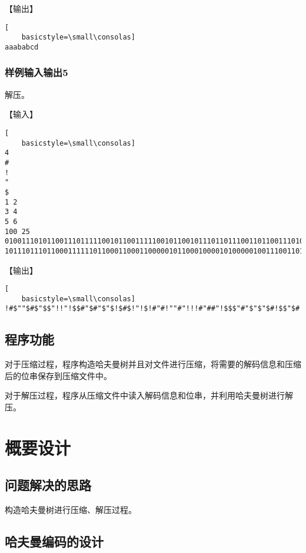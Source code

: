 \documentclass{article}
\begin{document}
【输出】

\begin{lstlisting}[
    basicstyle=\small\consolas]
aaababcd
\end{lstlisting}

\subsubsection{样例输入输出5}

解压。

【输入】

\begin{lstlisting}[
    basicstyle=\small\consolas]
4
#
!
"
$
1 2
3 4
5 6
100 25
010011101011001110111110010110011111001011001011101101110011011001110100100001101000100101010010000010011111111000
10111011101100011111101100011000110000010110001000010100000100111001101011011001001111
\end{lstlisting}

【输出】

\begin{lstlisting}[
    basicstyle=\small\consolas]
!#$""$#$"$$"!!"!$$#"$#"$"$!$#$!"!$!#"#!""#"!!!#"##"!$$$"#"$"$"$#!$$"$#!"#$##!!"#"#!!##!#$"!""$!"!#$$
\end{lstlisting}

\subsection{程序功能}

对于压缩过程，程序构造哈夫曼树并且对文件进行压缩，将需要的解码信息和压缩后的位串保存到压缩文件中。

对于解压过程，程序从压缩文件中读入解码信息和位串，并利用哈夫曼树进行解压。

\section{概要设计}

\subsection{问题解决的思路}

构造哈夫曼树进行压缩、解压过程。

\subsection{哈夫曼编码的设计}

\begin{lstlisting}[language={C},
    numbers=left,
    numberstyle=\tiny\consolas,
    basicstyle=\small\consolas]
\end{lstlisting}
\end{document}
